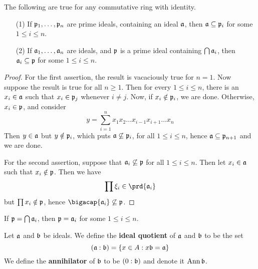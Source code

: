 \begin{lemma}\label{1.6.7}
    The following are true for any commutative ring with identity.
    \begin{enumerate}
        \item[(1)] If $\pf_1, \dots, \pf_n$ are prime ideals, containing an
            ideal $\af$, then $\af \subseteq \pf_i$ for some  $1 \leq i \leq n$.

        \item[(2)] If $\af_1, \dots, \af_n$ are ideals, and $\pf$ is a prime
            ideal containing  $\bigcap{\af_i}$, then $\af_i \subseteq \pf$ for
            some  $1 \leq i \leq n$.
    \end{enumerate}
\end{lemma}
\begin{proof}
    For the first assertion, the result is vacaciously true for $n=1$. Now
    suppose the result is true for all  $n \geq 1$. Then for every  $1 \leq i
    \leq n$, there is an  $x_i \in \af$ such that  $x_i \in \pf_j$ whenever  $i
    \neq j$. Now, if  $x_i \notin \pf_i$, we are done. Otherwise, $x_i \in \pf$,
    and consider
    \begin{equation*}
        y=\sum_{i=1}^n{x_1x_2 \dots x_{i-1}x_{i+1} \dots x_n}
    \end{equation*}
    Then $y \in \af$ but $y \notin \pf_i$, which puts  $\af \not\subseteq
    \pf_i$, for all $1 \leq i \leq n$, hence $\af \subseteq \pf_{n+1}$ and we
    are done.

    For the second assertion, suppose that $\af_i \not\subseteq \pf$ for all
    $1 \leq i \leq n$. Then let  $x_i \in \af$ such that  $x_i \notin\pf$. Then
    we have
    \begin{equation*}
        \prod{\x_i} \in \prd{\af_i}
    \end{equation*}
    but $\prod{x_i} \notin \pf$, hence $\bigacap{\af_i} \not\subseteq \pf$.
\end{proof}
\begin{corollary}
    If $\pf=\bigcap{\af_i}$, then $\pf=\af_i$ for some  $1 \leq i \leq n$.
\end{corollary}

\begin{definition}
    Let $\af$ and $\bf$ be ideals. We define the \textbf{ideal quotient} of
    $\af$ and  $\bf$ to be the set
    \begin{equation*}
        (\af:\bf)=\{x \in A : x\bf=\af\}
    \end{equation*}
    We define the \textbf{annihilator} of $\bf$ to be $(0:\bf)$ and denote it
    $\Ann{\bf}$.
\end{definition}

